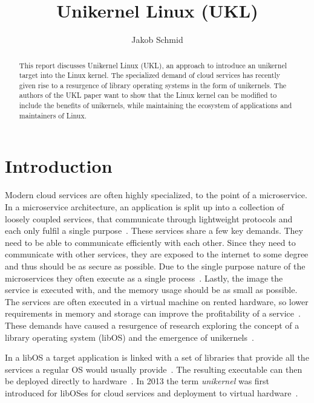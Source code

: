 \documentclass[10pt,twocolumn,a4paper]{article}
\author{Jakob Schmid}
\begin{document}
\title{Unikernel Linux (UKL)}

\newcommand{\todo}[1]{{\texttt{[#1]}}}
\newcommand{\code}[1]{{\tt \small{#1}}}
\newcommand{\refsec}[1]{{§~\ref{#1}}}

\maketitle

\begin{abstract}
  This report discusses Unikernel Linux (UKL), an approach to introduce an
  unikernel target into the Linux kernel.
  The specialized demand of cloud services has recently given rise
  to a resurgence of library operating systems in the form of unikernels.
  The authors of the UKL paper want to show that the Linux kernel can be
  modified to include the benefits of unikernels, while maintaining the
  ecosystem of applications and maintainers of Linux.
\end{abstract}

\section{Introduction}\label{sec:introduction}
  Modern cloud services are often highly specialized, to the point of a microservice.
  In a microservice architecture, an application is split up into a collection of loosely coupled services,
  that communicate through lightweight protocols and each only fulfil a single purpose~\cite{madhavapeddy13-2}.
  These services share a few key demands. They need to be able to communicate 
  efficiently with each other. Since they need to communicate with other services,
  they are exposed to the internet to some degree and thus should be as secure as possible.
  Due to the single purpose nature of the microservices they often execute as a single process~\cite{raza19}.
  Lastly, the image the service is executed with, and the memory usage should be as small as possible.
  The services are often executed in a virtual machine on rented hardware, so lower requirements
  in memory and storage can improve the profitability of a service~\cite{madhavapeddy13}.
  These demands have caused a resurgence of research exploring the concept of 
  a library operating system (libOS) and the emergence of unikernels~\cite{madhavapeddy13-2}. 

  In a libOS a target application is linked with a set of
  libraries that provide all the services a regular OS would usually provide~\cite{madhavapeddy13-2}.
  The resulting executable can then be deployed directly to hardware~\cite{raza19}.
  In 2013 the term \textit{unikernel} was first introduced for libOSes
  for cloud services and deployment to virtual hardware~\cite{madhavapeddy13}.
\end{document}
